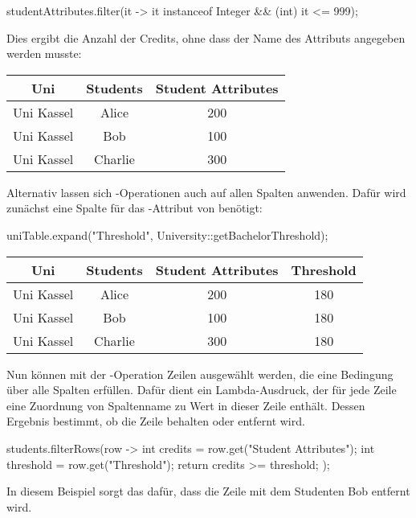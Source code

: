 \begin{jcodeblock}
    studentAttributes.filter(it -> it instanceof Integer && (int) it <= 999);
\end{jcodeblock}

Dies ergibt die Anzahl der Credits, ohne dass der Name des Attributs angegeben werden musste:

\begin{tabular}{|c|c|c|}
    \hline
    \textbf{Uni} & \textbf{Students} & \textbf{Student Attributes} \\
    \hline
    Uni Kassel & Alice   & 200 \\
    Uni Kassel & Bob     & 100 \\
    Uni Kassel & Charlie & 300 \\
    \hline
\end{tabular}

Alternativ lassen sich -Operationen auch auf allen Spalten anwenden.
Dafür wird zunächst eine Spalte für das -Attribut von  benötigt:

\begin{jcodeblock}
    uniTable.expand("Threshold", University::getBachelorThreshold);
\end{jcodeblock}

\begin{tabular}{|c|c|c|c|}
    \hline
    \textbf{Uni} & \textbf{Students} & \textbf{Student Attributes} & \textbf{Threshold} \\
    \hline
    Uni Kassel & Alice   & 200 & 180 \\
    Uni Kassel & Bob     & 100 & 180 \\
    Uni Kassel & Charlie & 300 & 180 \\
    \hline
\end{tabular}

Nun können mit der -Operation Zeilen ausgewählt werden, die eine Bedingung über alle Spalten erfüllen.
Dafür dient ein Lambda-Ausdruck, der für jede Zeile eine Zuordnung von Spaltenname zu Wert in dieser Zeile enthält.
Dessen Ergebnis bestimmt, ob die Zeile behalten oder entfernt wird.

\begin{jcodeblock}
    students.filterRows(row -> {
        int credits = row.get("Student Attributes");
        int threshold = row.get("Threshold");
        return credits >= threshold;
    });
\end{jcodeblock}

In diesem Beispiel sorgt das dafür, dass die Zeile mit dem Studenten Bob entfernt wird.

